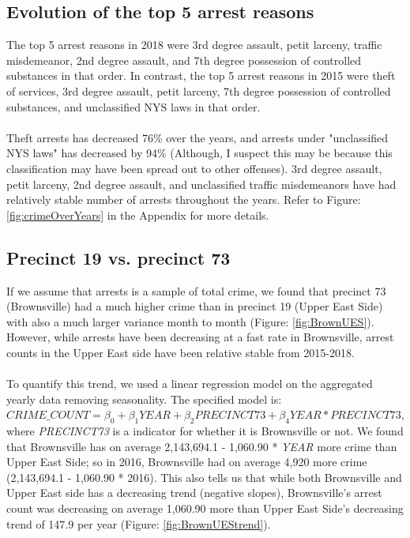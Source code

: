 \documentclass[11pt]{article}\usepackage[]{graphicx}\usepackage[]{color}
\begin{document}
\subsection{Evolution of the top 5 arrest reasons}
The top 5 arrest reasons in 2018 were 3rd degree assault, petit larceny, traffic misdemeanor, 2nd degree assault, and 7th degree possession of controlled substances in that order. In contrast, the top 5 arrest reasons in 2015 were theft of services, 3rd degree assault, petit larceny, 7th degree possession of controlled substances, and unclassified NYS laws in that order.
\\\\
Theft arrests has decreased 76\% over the years, and arrests under "unclassified NYS laws" has decreased by 94\% (Although, I suspect this may be because this classification may have been spread out to other offenses). 3rd degree assault, petit larceny, 2nd degree assault, and unclassified traffic misdemeanors have had relatively stable number of arrests throughout the years. Refer to Figure: \ref{fig:crimeOverYears} in the Appendix for more details.

\subsection{Precinct 19 vs. precinct 73}
If we assume that arrests is a sample of total crime, we found that precinct 73 (Brownsville) had a much higher crime than in precinct 19 (Upper East Side) with also a much larger variance month to month (Figure: \ref{fig:BrownUES}). However, while arrests have been decreasing at a fast rate in Brownsville, arrest counts in the Upper East side have been relative stable from 2015-2018. 
\\\\
To quantify this trend, we used a linear regression model on the aggregated yearly data removing seasonality. The specified model is: $CRIME\_COUNT = \beta_0 + \beta_1YEAR + \beta_2PRECINCT73 +\beta_4YEAR*PRECINCT73$, where \textit{PRECINCT73} is a indicator for whether it is Brownsville or not. We found that Brownsville has on average 2,143,694.1 - 1,060.90 * \textit{YEAR} more crime than Upper East Side; so in 2016, Brownsville had on average 4,920 more crime (2,143,694.1 - 1,060.90 * 2016). This also tells us that while both Brownsville and Upper East side has a decreasing trend (negative slopes), Brownsville's arrest count was decreasing on average 1,060.90 more than Upper East Side's decreasing trend of 147.9 per year (Figure: \ref{fig:BrownUEStrend}).
\end{document}
